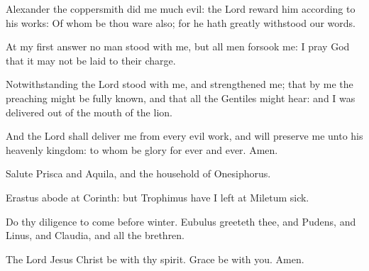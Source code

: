 \Verse Alexander the coppersmith did me much evil: the Lord reward him according to his works: \Verse Of whom be thou ware also; for he hath greatly withstood our words.

\Verse At my first answer no man stood with me, but all men forsook me: I pray God that it may not be laid to their charge.

\Verse Notwithstanding the Lord stood with me, and strengthened me; that by me the preaching might be fully known, and that all the Gentiles might hear: and I was delivered out of the mouth of the lion.

\Verse And the Lord shall deliver me from every evil work, and will preserve me unto his heavenly kingdom: to whom be glory for ever and ever. Amen.

\Verse Salute Prisca and Aquila, and the household of Onesiphorus.

\Verse Erastus abode at Corinth: but Trophimus have I left at Miletum sick.

\Verse Do thy diligence to come before winter. Eubulus greeteth thee, and Pudens, and Linus, and Claudia, and all the brethren.

\Verse The Lord Jesus Christ be with thy spirit. Grace be with you.  Amen.

